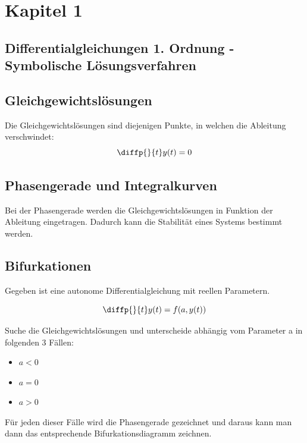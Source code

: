 \section{Kapitel 1}

\subsection{Differentialgleichungen 1. Ordnung - Symbolische Lösungsverfahren}
\subsection{Gleichgewichtslösungen}
Die Gleichgewichtslösungen sind diejenigen Punkte, in welchen die Ableitung verschwindet:
\begin{equation*}
	\diffp{}{t}y(t) = 0
\end{equation*}
\subsection{Phasengerade und Integralkurven}
Bei der Phasengerade werden die Gleichgewichtslösungen in Funktion der Ableitung eingetragen. Dadurch kann die Stabilität eines Systems bestimmt werden. 

\subsection{Bifurkationen}
Gegeben ist eine autonome Differentialgleichung mit reellen Parametern.

\begin{equation*}
	\diffp{}{t}y(t) = f(a,y(t))
\end{equation*}

Suche die Gleichgewichtslösungen und unterscheide abhängig vom Parameter a in folgenden 3 Fällen:\\
\begin{itemize}
\item $a<0$
\item $a=0$
\item $a>0$
\end{itemize}
Für jeden dieser Fälle wird die Phasengerade gezeichnet und daraus kann man dann das entsprechende Bifurkationsdiagramm zeichnen. 

